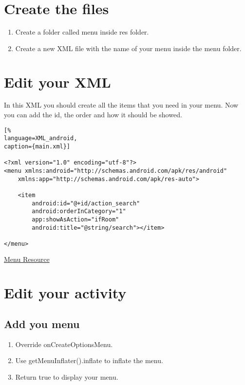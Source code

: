 \documentclass[12pt]{article} %
\begin{document}

\section{Create the files}

\begin{enumerate}
	\item Create a folder called menu inside res folder.
	\item Create a new XML file with the name of your menu inside the menu folder.
\end{enumerate}

\section{Edit your XML}
In this XML you should create all the items that you need in your menu. 
Now you can add the id, the order and how it should be showed.

\begin{lstlisting}[%
language=XML_android,
caption={main.xml}]

<?xml version="1.0" encoding="utf-8"?>
<menu xmlns:android="http://schemas.android.com/apk/res/android"
	xmlns:app="http://schemas.android.com/apk/res-auto">

	<item
		android:id="@+id/action_search"
		android:orderInCategory="1"
		app:showAsAction="ifRoom"
		android:title="@string/search"></item>

</menu>
\end{lstlisting}

\href{https://developer.android.com/guide/topics/resources/menu-resource.html}{Menu Resource}


\section{Edit your activity}

\subsection{Add you menu}

\begin{enumerate}
	\item Override onCreateOptionsMenu.
	\item Use getMenuInflater().inflate to inflate the menu.
	\item Return true to display your menu.
\end{enumerate}
\end{document}
